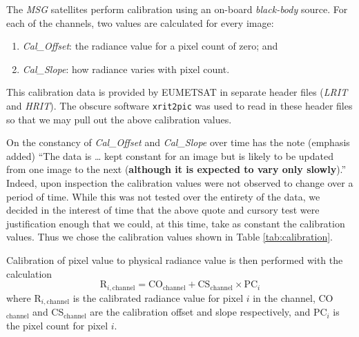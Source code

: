 The \emph{MSG} satellites perform calibration using an on-board
\emph{black-body} source. For each of the channels, two values are
calculated for every image:
\begin{enumerate}
\item \emph{Cal\_Offset}: the radiance value for a pixel count of
  zero; and
\item \emph{Cal\_Slope}: how radiance varies with pixel count.
\end{enumerate}
This calibration data is provided by EUMETSAT in separate header files
(\emph{LRIT} and \emph{HRIT}). The obscure software \texttt{xrit2pic}
was used to read in these header files so that we may pull out the
above calibration values.

On the constancy of \emph{Cal\_Offset} and \emph{Cal\_Slope} over time
\cite{muller2007msg} has the note (emphasis added) ``The data is {\dots} kept
constant for an image but is likely to be updated from one image to the next
(\textbf{although it is expected to vary only slowly}).''  Indeed, upon
inspection the calibration values were not observed to change over a period of
time. While this was not tested over the entirety of the data, we decided in the
interest of time that the above quote and cursory test were justification enough
that we could, at this time, take as constant the calibration values. Thus we
chose the calibration values shown in Table \ref{tab:calibration}.

\begin{table}
  \centering
  \caption{Calibration values for each band. It is assumed that these
    values vary only slowly, and so we have decided to use a single
    set of values.}
  \label{tab:calibration}
\end{table}

Calibration of pixel value to physical radiance value is then
performed with the calculation
\begin{equation}
    \textrm{R}_{i,\textrm{channel}} = \textrm{CO}_\textrm{channel} +
    \textrm{CS}_\textrm{channel} \times
    \textrm{PC}_i \label{eqn:calibration}
\end{equation}
where R$_{i,\textrm{channel}}$ is the calibrated radiance value for
pixel $i$ in the channel, CO$_\textrm{channel}$ and
CS$_\textrm{channel}$ are the calibration offset and slope
respectively, and PC$_i$ is the pixel count for pixel $i$.

